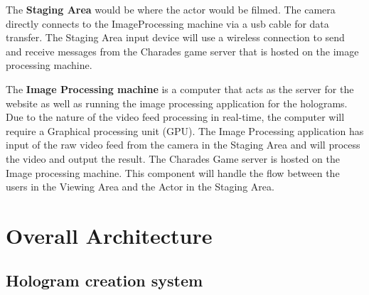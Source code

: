 The \textbf{Staging Area} would be where the actor would be filmed. The camera directly connects to the ImageProcessing machine via a usb cable for data transfer. The Staging Area input device will use a wireless connection to send and receive messages from the Charades game server that is hosted on the image processing machine.

The \textbf{Image Processing machine} is a computer that acts as the server for the website as well as running the image processing application for the holograms. Due to the nature of the video feed processing in real-time, the computer will require a Graphical processing unit (GPU). The Image Processing application has input of the raw video feed from the camera in the Staging Area and will process the video and output the result.
The Charades Game server is hosted on the Image processing machine. This component will handle the flow between the users in the Viewing Area and the Actor in the Staging Area.
\section{Overall Architecture}
\subsection{Hologram creation system}
\begin{figure}[h!]
\end{figure}

